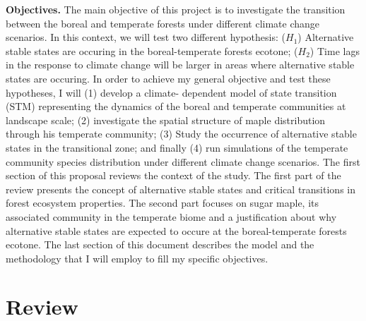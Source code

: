 \textbf{Objectives.} The main objective of this project is to investigate the
transition between the boreal and temperate forests under different climate
change scenarios. In this context, we will test two different hypothesis:
($H_1$) Alternative stable states are occuring in the boreal-temperate forests
ecotone;  ($H_2$) Time lags in the response to climate change will be larger
in areas where alternative stable states are occuring. In order to achieve my
general objective and test these hypotheses, I will (1) develop a climate-
dependent model of state transition (STM) representing the dynamics of the
boreal and temperate communities at landscape scale; (2) investigate the
spatial structure of maple distribution through his temperate community; (3)
Study the occurrence of alternative stable states in the transitional zone;
and finally (4) run simulations of the temperate community species
distribution under different climate change scenarios. The first section of
this proposal reviews the context of the study. The first part of the review
presents the concept of alternative stable states and critical transitions in
forest ecosystem properties. The second part focuses on sugar maple, its
associated community in the temperate biome and a justification about why
alternative stable states are expected to occure at the boreal-temperate
forests ecotone. The last section of this document describes the model and
the methodology that I will employ to fill my specific objectives. 

\section{Review} 

